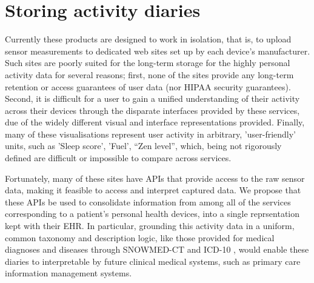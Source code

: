 \documentclass{chi-ext}
\begin{document}

\section{Storing activity diaries}

Currently these products are designed to work in isolation, that is, to upload sensor measurements to dedicated web sites set up by each device's manufacturer.  Such sites are poorly suited for the long-term storage for the highly personal activity data for several reasons; first, none of the sites provide any long-term retention or access guarantees of user data (nor HIPAA security guarantees).  Second, it is difficult for a user to gain a unified understanding of their activity across their devices through the disparate interfaces provided by these services, due of the widely different visual and interface representations provided. Finally, many of these visualisations represent user activity in arbitrary, 'user-friendly' units, such as 'Sleep score', 'Fuel', ``Zen level'', which, being not rigorously defined are difficult or impossible to compare across services.

Fortunately, many of these sites have APIs that provide access to the raw sensor data, making it feasible to access and interpret captured data.  We propose that these APIs be used to consolidate information from among all of the services corresponding to a patient's personal health devices, into a single reprsentation kept with their EHR.  In particular, grounding this activity data in a uniform, common taxonomy and description logic, like those provided for medical diagnoses and diseases through SNOWMED-CT \cite{stearns2001snomed} and ICD-10 \cite{world1993icd}, would enable these diaries to interpretable by future clinical medical systems, such as primary care information management systems. 
\end{document}
